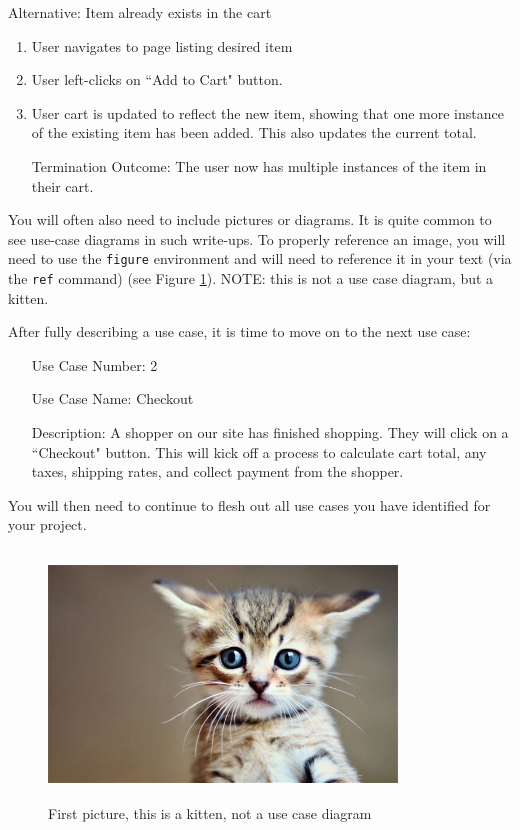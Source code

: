 \documentclass[10pt,conference,onecolumn,compsoc]{IEEEtran}
\begin{document}
Alternative: Item already exists in the cart
\begin{enumerate}
\item User navigates to page listing desired item
\item User left-clicks on ``Add to Cart" button.
\item User cart is updated to reflect the new item, showing that one more instance of the existing item has been added.  This also updates the current total.
\item[Termination Outcome:] The user now has multiple instances of the item in their cart.
\end{enumerate}

You will often also need to include pictures or diagrams.  It is quite common to see use-case diagrams in such write-ups.  To properly reference an image, you will need to use the \texttt{figure} environment and will need to reference it in your text (via the \texttt{ref} command) (see Figure \ref{cat1}).  NOTE: this is not a use case diagram, but a kitten.

After fully describing a use case, it is time to move on to the next use case:

\begin{itemize}
\item[Use Case Number:] 2
\item[Use Case Name:] Checkout
\item[Description:] A shopper on our site has finished shopping.  They will click on a ``Checkout" button.  This will kick off a process to calculate cart total, any taxes, shipping rates, and collect payment from the shopper.

\end{itemize}

You will then need to continue to flesh out all use cases you have identified for your project.

\begin{figure}[ht!]
\includegraphics[height=250px, width=350px]{cat1.jpg}
\caption{First picture, this is a kitten, not a use case diagram}
\label{cat1}
\end{figure}
\end{document}
